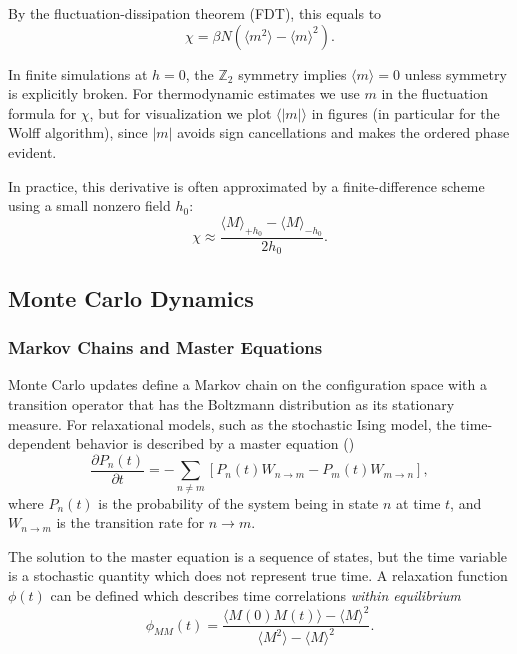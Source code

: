 By the fluctuation-dissipation theorem (FDT), this equals to
\begin{equation}
    \chi = \beta N (\langle m^2 \rangle - \langle m \rangle^2).
\end{equation}

In finite simulations at $h = 0$, the  $\mathbb{Z}_2$ symmetry implies $\langle m \rangle = 0$ unless symmetry is explicitly broken. For thermodynamic estimates we use $m$ in the fluctuation formula for $\chi$, but for visualization we plot $\langle |m| \rangle$ in figures (in particular for the Wolff algorithm), since $|m|$ avoids sign cancellations and makes the ordered phase evident.

In practice, this derivative is often approximated by a finite-difference scheme using a small nonzero field $h_0$:
\begin{equation}
\chi \approx \frac{\langle M \rangle_{+h_0} - \langle M \rangle_{-h_0}}{2 h_0}.
\end{equation}


\subsection{Monte Carlo Dynamics}

\subsubsection{Markov Chains and Master Equations}

Monte Carlo updates define a Markov chain on the configuration space with a transition operator that has the Boltzmann distribution as its stationary measure.
For relaxational models, such as the stochastic Ising model, the time-dependent behavior is described by a master equation (\cite{LandauMonteCarlo})
\begin{equation} \label{equ:MasterEqu}
\frac{\partial P_n(t)}{\partial t}
= - \sum_{n \neq m} \left[ P_n(t) W_{n \to m} - P_m(t) W_{m \to n} \right],
\end{equation}
where $P_n(t)$ is the probability of the system being in state $n$ at time $t$, and $W_{n \to m}$ is the transition rate for $n \to m$.

The solution to the master equation is a sequence of states, but the time variable is a stochastic quantity which does not represent true time.
A relaxation function $\phi(t)$ can be defined which describes time correlations \emph{within equilibrium}
\begin{equation}
\phi_{MM}(t)
= \frac{\langle M(0)M(t)\rangle - \langle M \rangle^2}
{\langle M^2 \rangle - \langle M \rangle^2}.
\end{equation}

